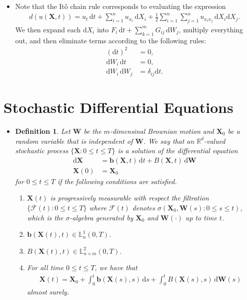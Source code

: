 \documentclass[10pt]{article}
\newtheorem{definition}[lemma]{Definition}
\newcommand{\dee}{\mathrm{d}}
\newcommand{\ve}[1]{\mathbf{#1}}
\newcommand{\mcal}[1]{\mathcal{#1}}
\newcommand{\Real}{\mathbb{R}}
\begin{document}
\begin{itemize}
  \item Note that the It\^{o} chain rule corresponds to evaluating the expression
  \begin{align*}
    d(u(\ve{X}, t)) = u_t\, \dee t + \sum_{i=1}^n u_{x_i}\, \dee X_i + \frac{1}{2} \sum_{i=1}^n \sum_{j=1}^n u_{x_i x_j}\, \dee X_i \dee X_j.
  \end{align*}
  We then expand each $\dee X_i$ into $F_i\, \dee t + \sum_{k=1}^m G_{ij}\, \dee W_j$, multiply everything out, and then eliminate terms according to the following rules:
  \begin{align*}
    (\dee t)^2 &= 0, \\
    \dee W_i\, \dee t &= 0, \\
    \dee W_i\, \dee W_j &= \delta_{ij} \dee t.
  \end{align*}
\end{itemize}

\section{Stochastic Differential Equations}

\begin{itemize}
  \item \begin{definition}
    Let $\ve{W}$ be the $m$-dimensinal Brownian motion and $\ve{X}_0$ be a random variable that is independent of $\ve{W}$. We say that an $\Real^d$-valued stochastic process $\{ \ve{X} : 0 \leq t \leq T \}$ is a solution of the differential equation
    \begin{align*}
      \dee\ve{X} &= \ve{b}(\ve{X},t)\, \dee t + B(\ve{X},t)\, \dee\ve{W} \\
      \ve{X}(0) &= \ve{X}_0
    \end{align*}        
    for $0 \leq t \leq T$ if the following conditions are satisfied.
    \begin{enumerate}      
      \item $\ve{X}(t)$ is progressively measurable with respect the filtration $\{ \mcal{F}(t) : 0 \leq t \leq T \}$ where $\mcal{F}(t)$ denotes $\sigma(\ve{X}_0, \ve{W}(s) : 0 \leq s \leq t)$, which is the $\sigma$-algebra generated by $\ve{X}_0$ and $\ve{W}(\cdot)$ up to time $t$.
      \item $\ve{b}(\ve{X}(t), t) \in \mathbb{L}^1_n(0,T)$.
      \item $B(\ve{X}(t), t) \in \mathbb{L}^2_{n \times m}(0,T)$.
      \item For all time $0 \leq t \leq T$, we have that
      \begin{align*}
        \ve{X}(t) = \ve{X}_0 + \int_0^t\ve{b}(\ve{X}(s), s)\, \dee s + \int_0^t B(\ve{X}(s), s)\, \dee\ve{W}(s)
      \end{align*}
      almost surely.
    \end{enumerate}
  \end{definition}  
\end{itemize}
\end{document}

